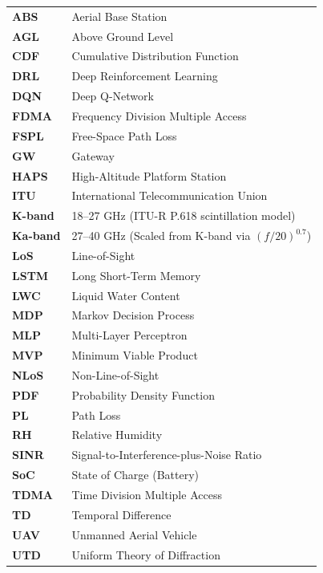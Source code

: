 \begin{tabular}{ll}
\textbf{ABS} & Aerial Base Station \\
\textbf{AGL} & Above Ground Level \\
\textbf{CDF} & Cumulative Distribution Function \\
\textbf{DRL} & Deep Reinforcement Learning \\
\textbf{DQN} & Deep Q-Network \\
\textbf{FDMA} & Frequency Division Multiple Access \\
\textbf{FSPL} & Free-Space Path Loss \\
\textbf{GW} & Gateway \\
\textbf{HAPS} & High-Altitude Platform Station \\
\textbf{ITU} & International Telecommunication Union \\
\textbf{K-band} & 18--27 GHz (ITU-R P.618 scintillation model) \\
\textbf{Ka-band} & 27--40 GHz (Scaled from K-band via $(f/20)^{0.7}$) \\
\textbf{LoS} & Line-of-Sight \\
\textbf{LSTM} & Long Short-Term Memory \\
\textbf{LWC} & Liquid Water Content \\
\textbf{MDP} & Markov Decision Process \\
\textbf{MLP} & Multi-Layer Perceptron \\
\textbf{MVP} & Minimum Viable Product \\
\textbf{NLoS} & Non-Line-of-Sight \\
\textbf{PDF} & Probability Density Function \\
\textbf{PL} & Path Loss \\
\textbf{RH} & Relative Humidity \\
\textbf{SINR} & Signal-to-Interference-plus-Noise Ratio \\
\textbf{SoC} & State of Charge (Battery) \\
\textbf{TDMA} & Time Division Multiple Access \\
\textbf{TD} & Temporal Difference \\
\textbf{UAV} & Unmanned Aerial Vehicle \\
\textbf{UTD} & Uniform Theory of Diffraction \\
\end{tabular}
